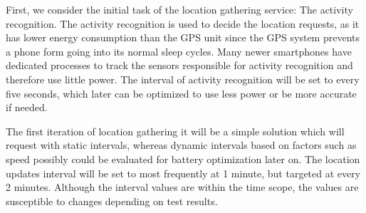 First, we consider the initial task of the location gathering service: The activity recognition.
The activity recognition is used to decide the location requests, as it has lower energy consumption than the GPS unit \cite{fuckGPS} since the GPS system prevents a phone form going into its normal sleep cycles.
Many newer smartphones \cite{coCPU} have dedicated processes to track the sensors responsible for activity recognition and therefore use little power.
The interval of activity recognition will be set to every five seconds, which later can be optimized to use less power or be more accurate if needed.

The first iteration of location gathering it will be a simple solution which will request with static intervals, whereas dynamic intervals based on factors such as speed possibly could be evaluated for battery optimization later on.
The location updates interval will be set to most frequently at 1 minute, but targeted at every 2 minutes.
Although the interval values are within the time scope, the values are susceptible to changes depending on test results.

